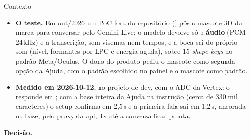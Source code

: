 \begin{especificacao}{Contexto}
\begin{itemize}
  \item \textbf{O teste.} Em out/2026 um PoC fora do repositório
    () pôs o mascote 3D da marca para conversar pelo
    Gemini Live: o modelo devolve só o \textbf{áudio} (PCM 24\,kHz) e a
    transcrição, sem visemas nem tempos, e a boca sai do próprio som (nível,
    formantes por LPC e energia aguda), sobre 15 \emph{shape keys} no padrão
    Meta/Oculus. O dono do produto pediu o mascote como segunda opção da Ajuda,
    com o padrão escolhido no painel e o mascote como padrão.
  \item \textbf{Medido em 2026-10-12}, no projeto de dev, com o ADC da Vertex:
    o  responde em ; com a base inteira da
    Ajuda na instrução (cerca de 330 mil caracteres) o setup confirma em 2,5\,s
    e a primeira fala sai em 1,2\,s, ancorada na base; pelo proxy da api, 3\,s
    até a conversa ficar pronta.
\end{itemize}
\end{especificacao}

\textbf{Decisão.}

